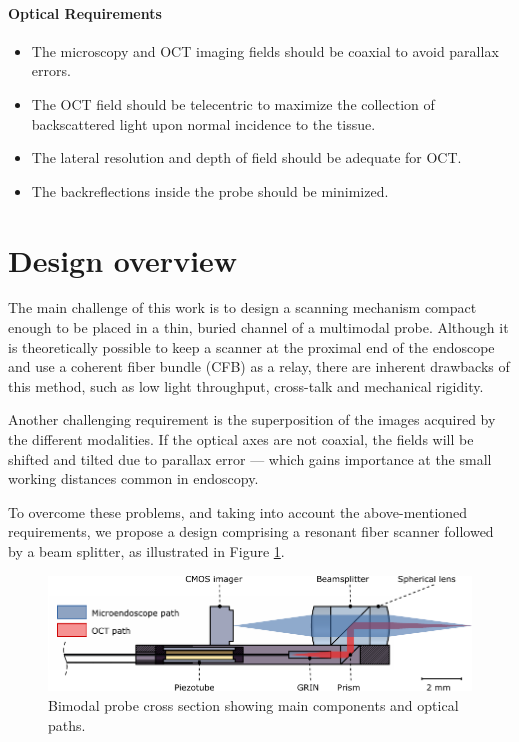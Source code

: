 \paragraph{Optical Requirements}

\begin{itemize}
\item The microscopy and OCT imaging fields should be coaxial to avoid parallax errors. 
\item The OCT field should be telecentric to maximize the collection of backscattered light upon normal incidence to the tissue.
\item The lateral resolution and depth of field should be adequate for OCT.
\item The backreflections inside the probe should be minimized.
\end{itemize}

  

\newpage
\section{Design overview}

The main challenge of this work is to design a scanning mechanism compact enough to be placed in a thin, buried channel of a multimodal probe. 
Although it is theoretically possible to keep a scanner at the proximal end of the endoscope and use a coherent fiber bundle (CFB) as a relay, there are inherent drawbacks of this method, such as low light throughput, cross-talk and mechanical rigidity. 

Another challenging requirement is the superposition of the images acquired by the different modalities. If the optical axes are not coaxial, the fields will be shifted and tilted due to parallax error --- which gains importance at the small working distances common in endoscopy.

To overcome these problems, and taking into account the above-mentioned requirements, we propose a design comprising a resonant fiber scanner followed by a beam splitter, as illustrated in Figure \ref{fig:bimodalSketch}.

\begin{figure}[h!]\centering
      \includegraphics{figures/10_Introduction/bimodalSketch/out.pdf}
      \caption{Bimodal probe cross section showing main components and optical paths.}
      \label{fig:bimodalSketch}
\end{figure}

